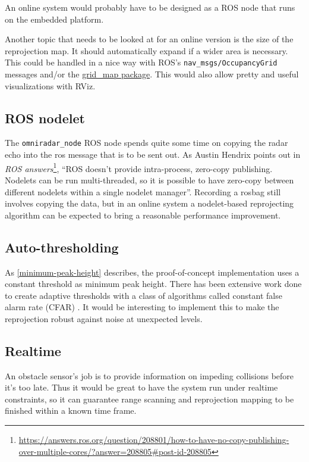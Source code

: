 An online system would probably have to be designed as a ROS node that
runs on the embedded platform.

Another topic that needs to be looked at for an online version is the
size of the reprojection map. It should automatically expand if a wider
area is necessary. This could be handled in a nice way with ROS's
\texttt{nav\_msgs/OccupancyGrid} messages and/or the
\href{http://wiki.ros.org/grid_map}{grid\_map package}. This would also
allow pretty and useful visualizations with RViz.

\subsection{ROS nodelet}\label{ros-nodelet}

The \texttt{omniradar\_node} ROS node spends quite some time on copying
the radar echo into the ros message that is to be sent out. As Austin
Hendrix points out in \textit{ROS answers}\footnote{\url{https://answers.ros.org/question/208801/how-to-have-no-copy-publishing-over-multiple-cores/?answer=208805\#post-id-208805}}, ``ROS doesn't provide intra-process, zero-copy publishing.
Nodelets can be run multi-threaded, so it is possible to have zero-copy
between different nodelets within a single nodelet manager''. Recording
a rosbag still involves copying the data, but in an online system a
nodelet-based reprojecting algorithm can be expected to bring a
reasonable performance improvement.

\subsection{Auto-thresholding}\label{auto-thresholding}

As \cref{minimum-peak-height} describes, the proof-of-concept implementation uses a constant threshold as minimum peak height. There has been extensive work done to create adaptive thresholds with a class of algorithms called constant false alarm rate (CFAR) \cite{Skolnik2008,Adams2012}. It would be interesting to implement this to make the reprojection robust against noise at unexpected levels.

\subsection{Realtime}\label{realtime}

An obstacle sensor's job is to provide information on impeding
collisions before it's too late. Thus it would be great to have the
system run under realtime constraints, so it can guarantee range
scanning and reprojection mapping to be finished within a known time
frame.

